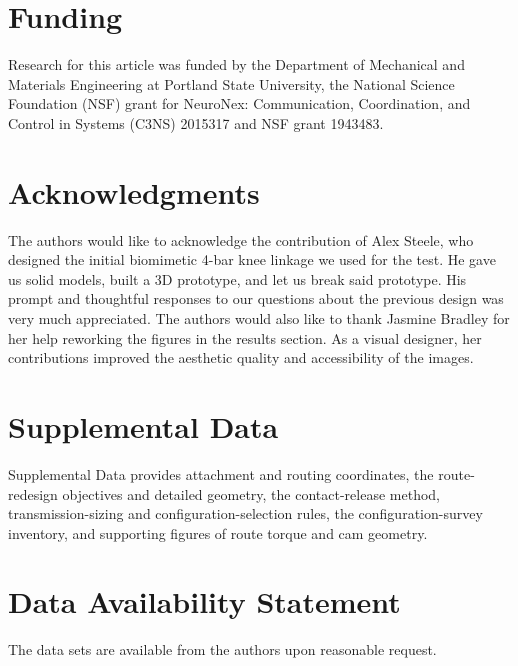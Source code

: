 \documentclass[utf8]{FrontiersinHarvard} %
\begin{document}
\section*{Funding}
Research for this article was funded by the Department of Mechanical and Materials Engineering at Portland State University, the National Science Foundation (NSF) grant for NeuroNex: Communication, Coordination, and Control in Systems (C3NS) 2015317 and NSF grant 1943483. 


\section*{Acknowledgments}
The authors would like to acknowledge the contribution of Alex Steele, who designed the initial biomimetic 4-bar knee linkage we used for the test. He gave us solid models, built a 3D prototype, and let us break said prototype. His prompt and thoughtful responses to our questions about the previous design was very much appreciated. The authors would also like to thank Jasmine Bradley for her help reworking the figures in the results section. As a visual designer, her contributions improved the aesthetic quality and accessibility of the images. 

\section*{Supplemental Data}
Supplemental Data provides attachment and routing coordinates, the route-redesign objectives and detailed geometry, the contact-release method, transmission-sizing and configuration-selection rules, the configuration-survey inventory, and supporting figures of route torque and cam geometry.
 

\section*{Data Availability Statement}
The data sets are available from the authors upon reasonable request.
\end{document}
